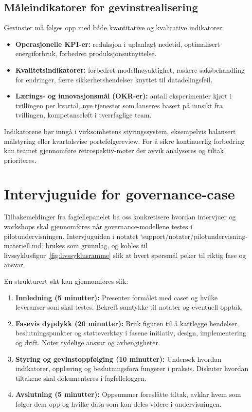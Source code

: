 \subsection*{Måleindikatorer for gevinstrealisering}
Gevinster må følges opp med både kvantitative og kvalitative indikatorer:
\begin{itemize}
    \item \textbf{Operasjonelle KPI-er:} reduksjon i uplanlagt nedetid, optimalisert energiforbruk, forbedret produksjonsutnyttelse.
    \item \textbf{Kvalitetsindikatorer:} forbedret modellnøyaktighet, raskere saksbehandling for endringer, færre sikkerhetshendelser knyttet til datadelingsfeil.
    \item \textbf{Lærings- og innovasjonsmål (OKR-er):} antall eksperimenter kjørt i tvillingen per kvartal, nye tjenester som lanseres basert på innsikt fra tvillingen, kompetanseløft i tverrfaglige team.
\end{itemize}
Indikatorene bør inngå i virksomhetens styringssystem, eksempelvis balansert målstyring eller kvartalsvise portefølgereview. For å sikre kontinuerlig forbedring kan teamet gjennomføre retrospektiv-møter der avvik analyseres og tiltak prioriteres.

\section{Intervjuguide for governance-case}
Tilbakemeldinger fra fagfellepanelet ba oss konkretisere hvordan intervjuer og workshops skal gjennomføres når governance-modellene testes i pilotundervisningen. Intervjuguiden i notatet `support/notater/pilotundervisning-materiell.md` brukes som grunnlag, og kobles til livssyklusfigur~\ref{fig:livssyklusramme} slik at hvert spørsmål peker til riktig fase og ansvar.

En strukturert økt kan gjennomføres slik:
\begin{enumerate}
    \item \textbf{Innledning (5 minutter):} Presenter formålet med caset og hvilke leveranser som skal testes. Bekreft samtykke til notater og eventuell opptak.
    \item \textbf{Fasevis dypdykk (20 minutter):} Bruk figuren til å kartlegge hendelser, beslutningspunkter og støtteverktøy i fasene initiativ, design, implementering og drift. Noter tydelige ansvar og avhengigheter.
    \item \textbf{Styring og gevinstoppfølging (10 minutter):} Undersøk hvordan indikatorer, opplæring og beslutningsfora fungerer i praksis. Diskuter hvordan tiltakene skal dokumenteres i fagfelleloggen.
    \item \textbf{Avslutning (5 minutter):} Oppsummer foreslåtte tiltak, avklar hvem som følger dem opp og hvilke data som kan deles videre i undervisningen.
\end{enumerate}

